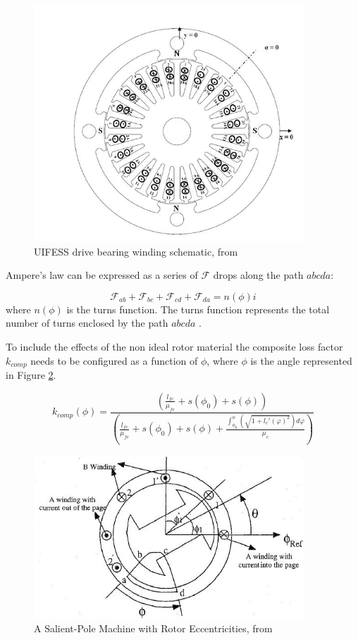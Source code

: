 \begin{figure}[h]
	\centering
	\includegraphics[width=4in]{./Pictures/DriveB.jpg}
	\caption{UIFESS drive bearing winding schematic, from \cite{Wimer}}
	\label{fig:DriveB}
\end{figure}

Ampere's law can be expressed as a series of $\mathcal{F}$ drops along the path $abcda$:

\begin{equation}\label{Eq:MMFdrops}
	\mathcal{F}_{ab}+\mathcal{F}_{bc}+\mathcal{F}_{cd}+\mathcal{F}_{da}=n(\phi)i
\end{equation}
where $n(\phi)$ is the turns function. The turns function represents the total number of turns enclosed by the path $abcda$ \cite{Wimer}. 

To include the effects of the non ideal rotor material the composite loss factor $k_{comp}$ needs to be configured as a function of $\phi$, where $\phi$ is the angle represented in Figure \ref{fig:SalientPole}. 

\begin{equation}\label{Eq:KcwP}
	k_{comp}(\phi)=\frac{\left(\frac{{l}_{fe}}{{\mu}_{fe}}+s({\phi}_{0})+s(\phi)\right)}{\left(\frac{{l}_{fe}}{{\mu}_{fe}}+s({\phi}_{0})+s(\phi)+\frac{{\int}_{{\phi}_{0}}^{\phi}\left(\sqrt{1+{{l}_{c}'(\varphi)}^{2}}\right)d\varphi}{{\mu}_{c}}\right)}
\end{equation}

\begin{figure}[!t]
	\centering
	\includegraphics[width=4in]{./Pictures/SalientPole.jpg}
	\caption{A Salient-Pole Machine with Rotor Eccentricities, from \cite{MWFwE}}
	\label{fig:SalientPole}
\end{figure}

